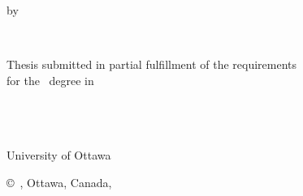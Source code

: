 \pagestyle{empty}

\begin{titlepage}
        \begin{center}
        \vspace*{1.0cm}

        \Huge
        {\bf \thesistitlecoverpage }

        \vspace*{1.0cm}

        \normalsize
        by \\

        \vspace*{1.0cm}

        \Large
        \thesisauthor \\

        \vspace*{3.0cm}

        \normalsize
        Thesis submitted in partial fulfillment of the requirements\\
        for the \degree~degree in\\
        \nameofprogram\\

        \vspace*{2.0cm}

        \academicunit\\
        \faculty\\
        University of Ottawa\\

        \vspace*{1.0cm}

        \copyright~\thesisauthor, Ottawa, Canada, \graduationyear\\
        \end{center}
\end{titlepage}

\pagestyle{plain}
\setcounter{page}{2}

\cleardoublepage %
